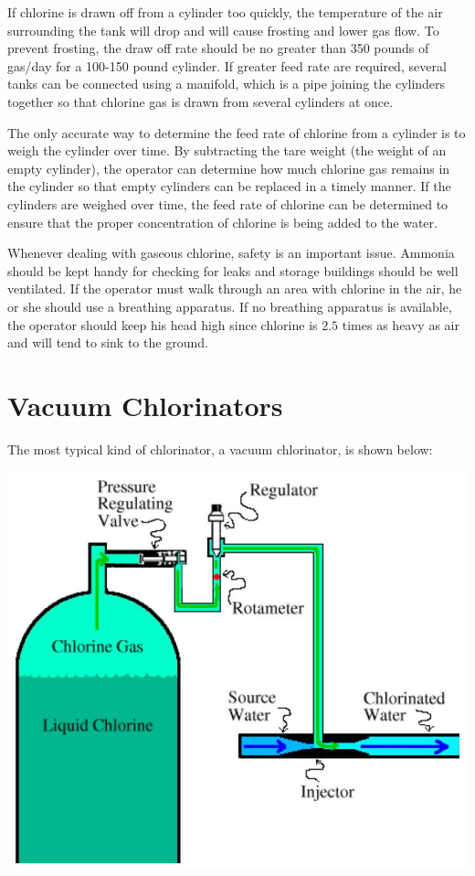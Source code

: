 \documentclass[10pt]{article}
\begin{document}
If chlorine is drawn off from a cylinder too quickly, the temperature of the air surrounding the tank will drop and will cause frosting and lower gas flow. To prevent frosting, the draw off rate should be no greater than 350 pounds of gas/day for a 100-150 pound cylinder. If greater feed rate are required, several tanks can be connected using a manifold, which is a pipe joining the cylinders together so that chlorine gas is drawn from several cylinders at once.

The only accurate way to determine the feed rate of chlorine from a cylinder is to weigh the cylinder over time. By subtracting the tare weight (the weight of an empty cylinder), the operator can determine how much chlorine gas remains in the cylinder so that empty cylinders can be replaced in a timely manner. If the cylinders are weighed over time, the feed rate of chlorine can be determined to ensure that the proper concentration of chlorine is being added to the water.

Whenever dealing with gaseous chlorine, safety is an important issue. Ammonia should be kept handy for checking for leaks and storage buildings should be well ventilated. If the operator must walk through an area with chlorine in the air, he or she should use a breathing apparatus. If no breathing apparatus is available, the operator should keep his head high since chlorine is $2.5$ times as heavy as air and will tend to sink to the ground.

\section{Vacuum Chlorinators}
The most typical kind of chlorinator, a vacuum chlorinator, is shown below:

\includegraphics[max width=\textwidth]{2022_10_14_eba0aec33b37be0fbdf2g-14(1)}
\end{document}
